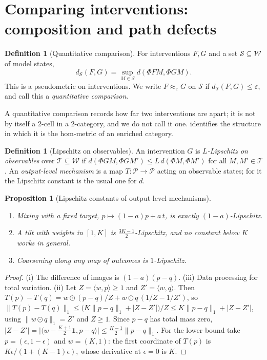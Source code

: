 \documentclass[11pt]{article}
\newtheorem{proposition}[theorem]{Proposition}
\theoremstyle{definition}
\newtheorem{definition}[theorem]{Definition}
\theoremstyle{remark}
\newcommand{\cP}{\mathcal{P}}
\newcommand{\cW}{\mathcal{W}}
\newcommand{\cS}{\mathcal{S}}
\begin{document}
\section{Comparing interventions: composition and path defects}\label{sec:composition}

\begin{definition}[Quantitative comparison]\label{def:comparison}
For interventions $F,G$ and a set $\cS\subseteq\cW$ of model states,
\[
d_\cS(F,G)=\sup_{M\in\cS}d(\Phi FM,\Phi GM).
\]
This is a pseudometric on interventions. We write $F\approx_\varepsilon G$ on $\cS$ if
$d_\cS(F,G)\le\varepsilon$, and call this a \emph{quantitative comparison}.
\end{definition}

A quantitative comparison records how far two interventions are apart; it is not by itself a 2-cell
in a 2-category, and we do not call it one.  identifies the structure in which it is
the hom-metric of an enriched category.

\begin{definition}[Lipschitz on observables]
An intervention $G$ is \emph{$L$-Lipschitz on observables} over $\mathcal{T}\subseteq\cW$ if
$d(\Phi GM,\Phi GM')\le L\,d(\Phi M,\Phi M')$ for all $M,M'\in\mathcal T$. An \emph{output-level
mechanism} is a map $T\colon\cP\to\cP$ acting on observable states; for it the Lipschitz constant is the
usual one for $d$.
\end{definition}

\begin{proposition}[Lipschitz constants of output-level mechanisms]\label{prop:lipschitz}
\leavevmode
\begin{enumerate}[label=(\roman*)]
\item Mixing with a fixed target, $p\mapsto(1-a)p+a\,t$, is exactly $(1-a)$-Lipschitz.
\item A tilt with weights in $[1,K]$ is $\tfrac{3K-1}{2}$-Lipschitz, and no constant below $K$ works in
  general.
\item Coarsening along any map of outcomes is $1$-Lipschitz.
\end{enumerate}
\end{proposition}
\begin{proof}
(i) The difference of images is $(1-a)(p-q)$. (iii) Data processing for total variation. (ii) Let
$Z=\langle w,p\rangle\ge1$ and $Z'=\langle w,q\rangle$. Then
$T(p)-T(q)=w\odot(p-q)/Z+w\odot q\,(1/Z-1/Z')$, so
$\lVert T(p)-T(q)\rVert_1\le\big(K\lVert p-q\rVert_1+\lvert Z-Z'\rvert\big)/Z\le K\lVert
p-q\rVert_1+\lvert Z-Z'\rvert$, using $\lVert w\odot q\rVert_1=Z'$ and $Z\ge1$. Since $p-q$ has total mass zero,
$\lvert Z-Z'\rvert=\lvert\langle w-\tfrac{K+1}2\mathbf 1,p-q\rangle\rvert\le\tfrac{K-1}2\lVert
p-q\rVert_1$. For the lower bound take $p=(\epsilon,1-\epsilon)$ and $w=(K,1)$: the first coordinate
of $T(p)$ is $K\epsilon/(1+(K-1)\epsilon)$, whose derivative at $\epsilon=0$ is $K$.
\end{proof}
\end{document}

